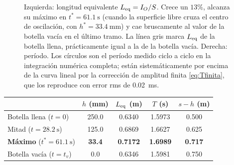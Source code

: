 \documentclass[11pt,a4paper]{article}
\begin{document}
\begin{figure}[H]
\centering
{}
\hfill
{}
\caption{Izquierda: longitud equivalente $L_{\rm eq}=I_O/S$. Crece un $13\%$, alcanza su máximo en
$t^\ast=\SI{61.1}{\second}$ (cuando la superficie libre cruza el centro de oscilación, con
$h^\ast=\SI{33.4}{\milli\meter}$) y cae bruscamente al valor de la botella vacía en el último
tramo. La línea gris marca $L_{\rm eq}$ de la botella llena, prácticamente igual a la de la
botella vacía. Derecha: período. Los círculos son el período medido ciclo a ciclo en la
integración numérica completa; están sistemáticamente por encima de la curva lineal por la
corrección de amplitud finita \eqref{eq:Tfinita}, que los reproduce con error rms de
\SI{0.02}{\milli\second}.}
\label{fig:periodo}
\end{figure}

\begin{center}
\renewcommand{\arraystretch}{1.15}
\begin{tabular}{@{}lcccc@{}}
\toprule
 & $h$ (mm) & $L_{\rm eq}$ (m) & $T$ (s) & $s-h$ (m)\\
\midrule
Botella llena ($t=0$)              & 250.0 & 0.6340 & 1.5973 & 0.500\\
Mitad ($t=\SI{28.2}{\second}$)     & 125.0 & 0.6869 & 1.6627 & 0.625\\
\textbf{Máximo} ($t^\ast=\SI{61.1}{\second}$) & \textbf{33.4} & \textbf{0.7172} & \textbf{1.6989} & \textbf{0.717}\\
Botella vacía ($t=t_v$)            & 0.0   & 0.6346 & 1.5981 & 0.750\\
\bottomrule
\end{tabular}
\end{center}
\end{document}
